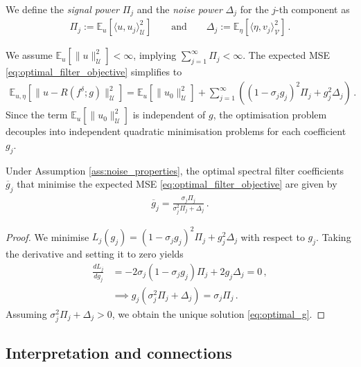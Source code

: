 \begin{defi}\normalfont
We define the \emph{signal power} $\Pi_j$ and the \emph{noise power} $\Delta_j$ for the $j$-th component as
\begin{align*}
\Pi_j := \mathbb{E}_u[ \langle u, u_j \rangle_{\mathcal{U}}^2 ] \qquad \text{and} \qquad \Delta_j := \mathbb{E}_\eta[ \langle \eta, v_j \rangle_{\mathcal{V}}^2 ] \, .
\end{align*}
\end{defi}
\noindent We assume $\mathbb{E}_u[\|u\|_{\mathcal{U}}^2] < \infty$, implying $\sum_{j = 1}^\infty \Pi_j < \infty$. The expected MSE \eqref{eq:optimal_filter_objective} simplifies to
\begin{align*}
\mathbb{E}_{u,\eta} \left[ \| u - R(f^\delta; g) \|_{\mathcal{U}}^2 \right] = \mathbb{E}_u[\|u_0\|_{\mathcal{U}}^2] + \sum_{j=1}^\infty \left( (1 - \sigma_j g_j)^2 \Pi_j + g_j^2 \Delta_j \right) \, .
\end{align*}
Since the term $\mathbb{E}_u[\|u_0\|_{\mathcal{U}}^2]$ is independent of $g$, the optimisation problem decouples into independent quadratic minimisation problems for each coefficient $g_j$.

\begin{thm}\label{thm:optimal_filter}
Under Assumption \ref{ass:noise_properties}, the optimal spectral filter coefficients $\overline{g}_j$ that minimise the expected MSE \eqref{eq:optimal_filter_objective} are given by
\begin{align}
\overline{g}_j = \frac{\sigma_j \Pi_j}{\sigma_j^2 \Pi_j + \Delta_j} \, . \label{eq:optimal_g}
\end{align}
\end{thm}
\begin{proof}
We minimise $L_j(g_j) = (1 - \sigma_j g_j)^2 \Pi_j + g_j^2 \Delta_j$ with respect to $g_j$. Taking the derivative and setting it to zero yields
\begin{align*}
\frac{d L_j}{d g_j} &= -2\sigma_j (1 - \sigma_j g_j) \Pi_j + 2g_j \Delta_j = 0 \, ,\\
&\implies g_j (\sigma_j^2 \Pi_j + \Delta_j) = \sigma_j \Pi_j \, .
\end{align*}
Assuming $\sigma_j^2 \Pi_j + \Delta_j > 0$, we obtain the unique solution \eqref{eq:optimal_g}.
\end{proof}

\subsection{Interpretation and connections}

